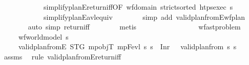 \begin{isabellebody}
\ \ \ \ \ \ \ \ \ \ \ \ simplify{\isacharunderscore}{\kern0pt}planE{\isacharunderscore}{\kern0pt}return{\isacharunderscore}{\kern0pt}iff{\isacharbrackleft}{\kern0pt}OF\ {\isacartoucheopen}wf{\isacharunderscore}{\kern0pt}domain{\isacartoucheclose}\ {\isacartoucheopen}strict{\isacharunderscore}{\kern0pt}sorted\ {\isacharparenleft}{\kern0pt}htps{\isacharunderscore}{\kern0pt}exec\ {\isasympi}s{\isacharparenright}{\kern0pt}{\isacartoucheclose}{\isacharbrackright}{\kern0pt}\isanewline
\ \ \ \ \ \ \ \ \ \ \ \ simplify{\isacharunderscore}{\kern0pt}planE{\isacharunderscore}{\kern0pt}avl{\isacharunderscore}{\kern0pt}equiv\isanewline
\ \ \ \ \ \ \isamarkupfalse%
\ {\isacharparenleft}{\kern0pt}simp\ add{\isacharcolon}{\kern0pt}\ valid{\isacharunderscore}{\kern0pt}plan{\isacharunderscore}{\kern0pt}fromE{\isacharunderscore}{\kern0pt}wf{\isacharunderscore}{\kern0pt}plan{\isacharparenright}{\kern0pt}\ \isanewline
\ \ \ \ \ \ \isamarkupfalse%
\ {\isacharparenleft}{\kern0pt}auto\ simp{\isacharcolon}{\kern0pt}\ return{\isacharunderscore}{\kern0pt}iff{\isacharparenright}{\kern0pt}\isanewline
\ \ \ \ \ \ \isamarkupfalse%
\ metis{\isacharplus}{\kern0pt}\isanewline
\ \ \ \ \ \ \isamarkupfalse%
\isanewline
\ \ \isamarkupfalse%
%
\endisatagproof
{\isafoldproof}%
%
\isadelimproof
\isanewline
%
\endisadelimproof
\isanewline
\ \ \isanewline
\ \ \isamarkupfalse%
\ {\isacharparenleft}{\kern0pt}\ wf{\isacharunderscore}{\kern0pt}ast{\isacharunderscore}{\kern0pt}problem{\isacharparenright}{\kern0pt}\isanewline
\ \ \ \ \ {\isachardoublequoteopen}wf{\isacharunderscore}{\kern0pt}world{\isacharunderscore}{\kern0pt}model\ s{\isachardoublequoteclose}\isanewline
\ \ \ \ \ {\isachardoublequoteopen}valid{\isacharunderscore}{\kern0pt}plan{\isacharunderscore}{\kern0pt}from{}E\ STG\ mp{\isacharunderscore}{\kern0pt}objT\ mp{\isacharunderscore}{\kern0pt}Fevl\ s\ {\isasympi}s\ {\isacharequal}{\kern0pt}\ Inr\ {\isacharparenleft}{\kern0pt}{\isacharparenright}{\kern0pt}\ {\isasymlongleftrightarrow}\ valid{\isacharunderscore}{\kern0pt}plan{\isacharunderscore}{\kern0pt}from{}\ s\ {\isasympi}s{\isachardoublequoteclose}\isanewline
%
\isadelimproof
\ \ \ \ %
\endisadelimproof
%
\isatagproof
{}\isamarkupfalse%
\ assms\ \isamarkupfalse%
\ {\isacharparenleft}{\kern0pt}rule\ valid{\isacharunderscore}{\kern0pt}plan{\isacharunderscore}{\kern0pt}from{}E{\isacharunderscore}{\kern0pt}return{\isacharunderscore}{\kern0pt}iff{\isacharparenright}{\kern0pt}%

\end{isabellebody}
